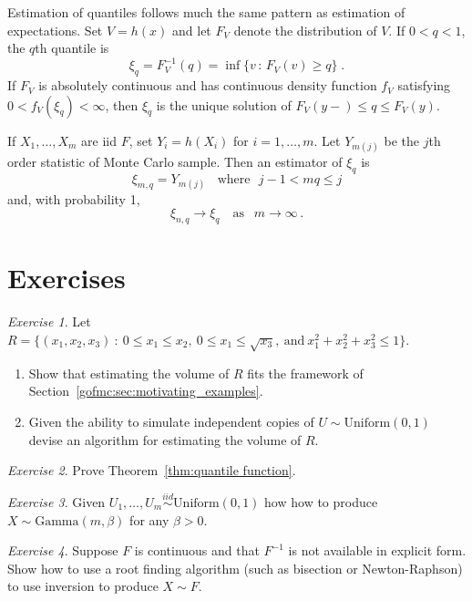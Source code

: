 \documentclass[12pt]{article}
\theoremstyle{plain}
\theoremstyle{definition}
\theoremstyle{remark}
\newtheorem{hw}{Exercise}[section]
\begin{document}
Estimation of quantiles follows much the same pattern as estimation of
expectations.  Set $V=h(x)$ and let $F_V$ denote the distribution of
$V$.  If $0 < q < 1$, the $q$th quantile is
\[
\xi_{q} = F_{V}^{-1}(q) = \inf \{ v \, : \, F_{V}(v) \ge q\} \; .
\]
If $F_V$ is absolutely continuous and has continuous density function
$f_V$ satisfying $0 < f_V(\xi_q) < \infty$, then $\xi_q$ is the unique
solution of $F_V(y-) \le q \le F_V(y)$.

If $X_1, \ldots, X_m$ are iid $F$, set $Y_i = h(X_i)$ for
$i=1, \ldots, m$.  Let $Y_{m(j)}$ be the $j$th order statistic of
Monte Carlo sample.  Then an estimator of $\xi_q$ is
\begin{equation}
\label{gofmc:eq: sample quantile}
\xi_{m,q} = Y_{m(j)}~~~~\text{where}~~~j-1 < mq \le j
\end{equation}
and, with probability 1,
\begin{equation}
\label{gofmc:eq:quantile convergence}
\xi_{n,q} \to \xi_q ~~~\text{ as } ~~ m \to \infty\, .
\end{equation}


\section*{Exercises}
\begin{hw}
Let $R = \{(x_1, x_2, x_3) ~:~ 0\le x_1\le x_2, ~0 \le x_1 \le
  \sqrt{x_3},~ \text{and}~ x_1^2 + x_2^2 + x_3^2 \le 1 \}$.
\begin{enumerate}
\item Show that estimating the volume of $R$ fits the framework of
  Section~\ref{gofmc:sec:motivating_examples}.
\item Given the ability to simulate independent copies of $U \sim
  \text{Uniform}(0,1)$ devise an algorithm for estimating the volume
  of $R$.
\end{enumerate}
\end{hw}

\begin{hw}
  Prove Theorem~\ref{thm:quantile function}.
\end{hw}

\begin{hw} 
Given $U_1, \ldots , U_m \stackrel{iid}{\sim}
  \text{Uniform}(0,1)$ how how to produce $X \sim \text{Gamma}(m,
  \beta)$ for any $\beta > 0$.
\end{hw}

\begin{hw}
Suppose $F$ is continuous and that  $F^{-1}$ is not available in
explicit form. Show how to use a root finding algorithm (such as
bisection or Newton-Raphson) to use inversion to produce $X \sim F$. 
\end{hw}
\end{document}
